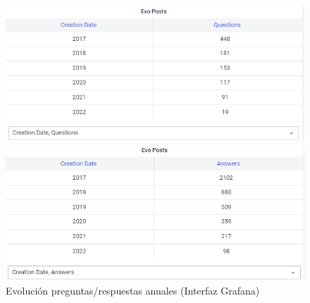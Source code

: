 \documentclass[a4paper, 12pt]{book}
\begin{document}
\begin{figure}
    \begin{minipage}[b]{0.45\linewidth}
        \centering
        \includegraphics[width=\textwidth]{img/cse/evo_posts_questions.png}
        \end{minipage}
    \hspace{0.5cm}
    \begin{minipage}[b]{0.45\linewidth}
        \centering
        \includegraphics[width=\textwidth]{img/cse/evo_posts_answers.png}
    \end{minipage}
    \caption{Evolución preguntas/respuestas anuales (Interfaz Grafana)}
    \label{fig:Pq_an}
\end{figure}
\end{document}
